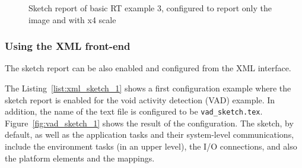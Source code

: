 \begin{figure}[h]
\centering
\caption{Sketch report of basic RT example 3, configured to report only the image and with x4 scale} 
\label{fig:ex3_sketch_only_img}
\end{figure}


\subsubsection{Using the XML front-end}
\label{sec:sketch_report_xml}

The sketch report can be also enabled and configured from the XML interface.

The Listing~\ref{list:xml_sketch_1} shows a first configuration example where
the sketch report is enabled for the void activity detection (VAD) example.
In addition, the name of the text file is configured to be \texttt{vad\_sketch.tex}.
Figure~\ref{fig:vad_sketch_1} shows the result of the configuration.
The sketch, by default, as well as the application tasks and their system-level 
communications, include the environment tasks (in an upper level), the I/O connections,
and also the platform elements and the mappings.

